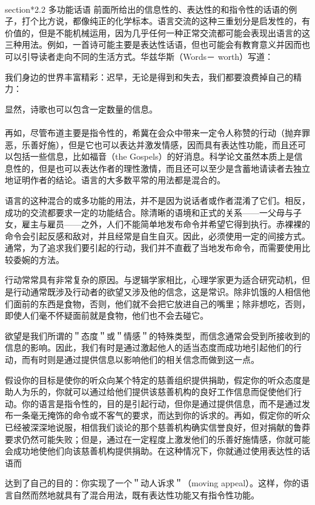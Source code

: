 \
\\section*{2.2 多功能话语}
前面所给出的信息性的、表达性的和指令性的话语的例子，打个比方说，都像纯正的化学标本。语言交流的这种三重划分是启发性的，有价值的，但是不能机械运用，因为几乎任何一种正常交流都可能会表现出语言的这三种用法。例如，一首诗可能主要是表达性话语，但也可能会有教育意义并因而也可以引导读者走向不同的生活方式。华兹华斯（Words－ worth）写道：

我们身边的世界丰富精彩：迟早，无论是得到和失去，我们都要浪费掉自己的精力：

显然，诗歌也可以包含一定数量的信息。\\\\
再如，尽管布道主要是指令性的，希冀在会众中带来一定令人称赞的行动（抛弃罪恶，乐善好施），但是它也可以表达并激发情感，因而具有表达性功能，而且还可以包括一些信息，比如福音（the Gospels）的好消息。科学论文虽然本质上是信息性的，但是也可以表达作者的理性激情，而且还可以至少是含蓄地请读者去独立地证明作者的结论。语言的大多数平常的用法都是混合的。

语言的这种混合的或多功能的用法，并不是因为说话者或作者混淆了它们。相反，成功的交流都要求一定的功能结合。除清晰的语境和正式的关系——一父母与子女，雇主与雇员——之外，人们不能简单地发布命令并希望它得到执行。赤裸裸的命令会引起反感和敌对，并且经常是自生自灭。因此，必须使用一定的间接方式。通常，为了追求我们要引起的行动，我们并不直截了当地发布命令，而需要使用比较委婉的方法。

行动常常具有非常复杂的原因。与逻辑学家相比，心理学家更为适合研究动机，但是行动通常既涉及行动者的欲望又涉及他的信念，这是常识。除非饥饿的人相信他们面前的东西是食物，否则，他们就不会把它放进自己的嘴里；除非想吃，否则，即使人们毫不怀疑面前就是食物，他们也不会去碰它。

欲望是我们所谓的＂态度＂或＂情感＂的特殊类型，而信念通常会受到所接收到的信息的影响。因此，我们有时是通过激起他人的适当态度而成功地引起他们的行动，而有时则是通过提供信息以影响他们的相关信念而做到这一点。

假设你的目标是使你的听众向某个特定的慈善组织提供捐助，假定你的听众态度是助人为乐的，你就可以通过给他们提供该慈善机构的良好工作信息而促使他们行动。你的语言是指令性的，目的是引起行动，但你是通过提供信息，而不是通过发布一条毫无掩饰的命令或不客气的要求，而达到你的诉求的。再如，假定你的听众已经被深深地说服，相信我们谈论的那个慈善机构确实信誉良好，但对捐献的鲁莽要求仍然可能失败；但是，通过在一定程度上激发他们的乐善好施情感，你就可能会成功地使他们向该慈善机构提供捐助。在这种情况下，你就通过使用表达性的话语而

达到了自己的目的：你实现了一个＂动人诉求＂（moving appeal）。这样，你的语言自然而然地就具有了混合用法，既有表达性功能又有指令性功能。

